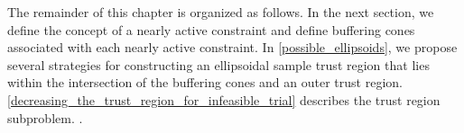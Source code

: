 %




The remainder of this chapter is organized as follows.
In the next section, we define the concept of a nearly active constraint and define buffering cones associated with each nearly active constraint.  
In \cref{possible_ellipsoids}, we propose several strategies for constructing an ellipsoidal sample trust region that lies 
within the intersection of the buffering cones and an outer trust region.
\cref{decreasing_the_trust_region_for_infeasible_trial} describes the trust region subproblem.   
.



